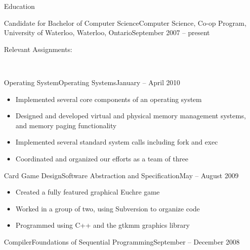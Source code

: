 \documentclass[11pt]{article}
\begin{document}
	\begin{section}{Education} \\

		\begin{subsection}{Candidate for Bachelor of Computer Science}{Computer Science, Co-op Program, University of Waterloo, Waterloo, Ontario}{September 2007 -- present}

			\begin{indent}
				\begin{bf}Relevant Assignments:\end{bf} \\

                \begin{subsection}{Operating System}{Operating Systems}{January -- April 2010}

					\begin{itemize}
						\item Implemented several core components of an operating system
                        \item Designed and developed virtual and physical memory management systems, and memory paging functionality
                        \item Implemented several standard system calls including fork and exec
                        \item Coordinated and organized our efforts as a team of three
					\end{itemize}

                \end{subsection}

				\begin{subsection}{Card Game Design}{Software Abstraction and Specification}{May -- August 2009}

					\begin{itemize}
						\item Created a fully featured graphical Euchre game
						\item Worked in a group of two, using Subversion to organize code
						\item Programmed using C++ and the gtkmm graphics library
					\end{itemize}

				\end{subsection}

				\begin{subsection}{Compiler}{Foundations of Sequential Programming}{September -- December 2008}


\end{subsection}
\end{indent}
\end{subsection}
\end{section}
\end{document}
